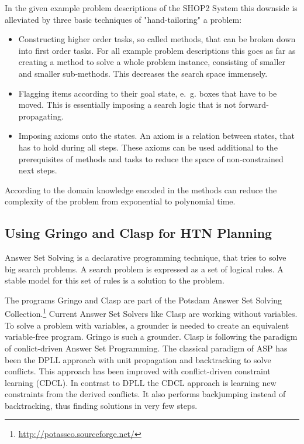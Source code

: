 \documentclass[10pt,a4paper]{article}
\begin{document}
In the given example problem descriptions of the SHOP2 System this downside is alleviated by three basic techniques of "hand-tailoring" a problem:
\begin{itemize}
\item Constructing higher order tasks, so called methods, that can be broken down into first order tasks. For all example problem descriptions this goes as far as creating a method to solve a whole problem instance, consisting of smaller and smaller sub-methods. This decreases the search space immensely.
\item Flagging items according to their goal state, e.~g. boxes that have to be moved. This is essentially imposing a search logic that is not forward-propagating.
\item Imposing axioms onto the states. An axiom is a relation between states, that has to hold during all steps. These axioms can be used additional to the prerequisites of methods and tasks to reduce the space of non-constrained next steps. 
\end{itemize}
According to \cite[p.~382]{Nau03} the domain knowledge encoded in the methods can reduce the complexity of the problem from exponential to polynomial time.


\subsection{Using Gringo and Clasp for HTN Planning}\label{GriCla}
Answer Set Solving is a declarative programming technique, that tries to solve big search problems. A search problem is expressed as a set of logical rules. A stable model for this set of rules is a solution to the problem.

The programs Gringo and Clasp are part of the Potsdam Answer Set Solving Collection.\footnote{\url{http://potassco.sourceforge.net/}} Current Answer Set Solvers like Clasp are working without variables. To solve a problem with variables, a grounder is needed to create an equivalent variable-free program. Gringo is such a grounder. 
Clasp is following the paradigm of conlict-driven Answer Set Programming. The classical paradigm of ASP has been the DPLL approach with unit propagation and backtracking to solve conflicts. This approach has been improved with conflict-driven constraint learning (CDCL). In contrast to DPLL the CDCL approach is learning new constraints from the derived conflicts. It also performs backjumping instead of backtracking, thus finding solutions in very few steps.
\end{document}
